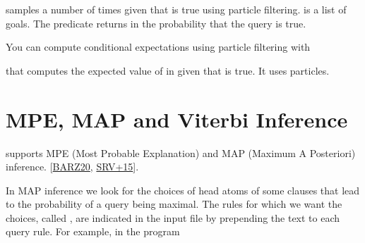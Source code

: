 \documentclass[letterpaper,10pt,english]{sphinxmanual}
\begin{document}
\sphinxAtStartPar
samples  a number of  times given that  is true using particle filtering.  is a list of goals.
The predicate returns in  the probability that the query is true.

\sphinxAtStartPar
You can compute conditional expectations using particle filtering with

\begin{sphinxVerbatim}[commandchars=\\\{\}]
  
\end{sphinxVerbatim}

\sphinxAtStartPar
that computes the expected value of  in  given that  is true.
It uses  particles.


\section{MPE, MAP and Viterbi Inference}
\label{\detokenize{index:mpe-map-and-viterbi-inference}}
\sphinxAtStartPar
{} supports MPE (Most Probable Explanation) and MAP (Maximum A Posteriori) inference. {[}\hyperlink{cite.index:id44}{BARZ20}, \hyperlink{cite.index:id43}{SRV+15}{]}.

\sphinxAtStartPar
In MAP inference we look for the choices of head atoms of some clauses that lead to the probability of a query being
maximal. The rules for which we want the choices, called , are indicated in the input file by prepending
the text  to each query rule. For example, in the program 
\end{document}
